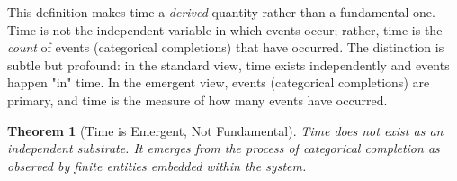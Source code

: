\documentclass[12pt,a4paper]{article}
\newtheorem{theorem}{Theorem}[section]
\theoremstyle{definition}
\theoremstyle{remark}
\begin{document}
This definition makes time a \emph{derived} quantity rather than a fundamental one. Time is not the independent variable in which events occur; rather, time is the \emph{count} of events (categorical completions) that have occurred. The distinction is subtle but profound: in the standard view, time exists independently and events happen "in" time. In the emergent view, events (categorical completions) are primary, and time is the measure of how many events have occurred.

\begin{theorem}[Time is Emergent, Not Fundamental]
\label{thm:time_emergent}
Time does not exist as an independent substrate. It emerges from the process of categorical completion as observed by finite entities embedded within the system.
\end{theorem}
\end{document}
